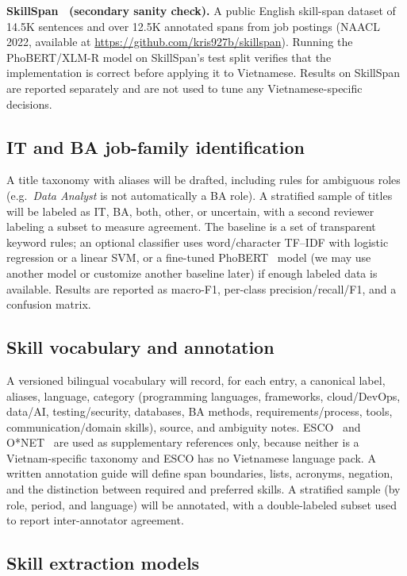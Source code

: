 \documentclass[12pt,a4paper]{article}
\begin{document}
\textbf{SkillSpan~\cite{skillspan} (secondary sanity check).}
A public English skill-span dataset of 14.5K sentences and over 12.5K
annotated spans from job postings (NAACL 2022, available at
\url{https://github.com/kris927b/skillspan}). Running the PhoBERT/XLM-R
model on SkillSpan's test split verifies that the implementation is correct
before applying it to Vietnamese. Results on SkillSpan are reported
separately and are not used to tune any Vietnamese-specific decisions.

\subsection{IT and BA job-family identification}
A title taxonomy with aliases will be drafted, including rules for ambiguous
roles (e.g.\ \emph{Data Analyst} is not automatically a BA role). A stratified
sample of titles will be labeled as IT, BA, both, other, or uncertain, with a
second reviewer labeling a subset to measure agreement. The baseline is a set
of transparent keyword rules; an optional classifier uses word/character
TF--IDF with logistic regression or a linear SVM, or a fine-tuned
PhoBERT~\cite{phobert} model (we may use another model or customize another baseline later) if enough labeled data is available. Results are
reported as macro-F1, per-class precision/recall/F1, and a confusion matrix.

\subsection{Skill vocabulary and annotation}
A versioned bilingual vocabulary will record, for each entry, a canonical
label, aliases, language, category (programming languages, frameworks,
cloud/\allowbreak DevOps, data/\allowbreak AI, testing/\allowbreak security,
databases, BA methods, requirements/\allowbreak process, tools,
communication/\allowbreak domain skills), source, and
ambiguity notes. ESCO~\cite{esco} and O*NET~\cite{onet} are used as
supplementary references only, because neither is a Vietnam-specific
taxonomy and ESCO has no Vietnamese language pack. A written annotation guide
will define span boundaries, lists, acronyms, negation, and the distinction
between required and preferred skills. A stratified sample (by role, period,
and language) will be annotated, with a double-labeled subset used to report
inter-annotator agreement.

\subsection{Skill extraction models}\label{sec:models}
\end{document}
